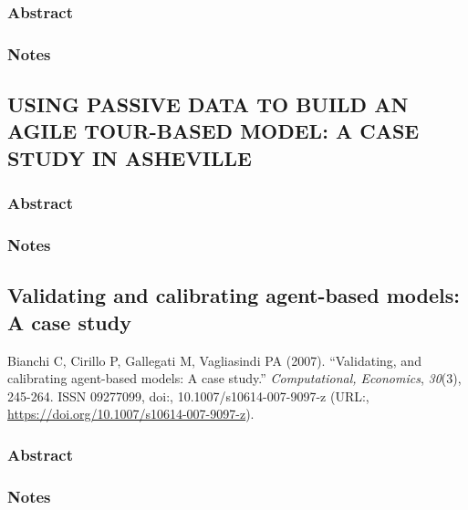 \documentclass[
]{article}
\begin{document}
\hypertarget{abstract-9}{%
\subsubsection{Abstract}\label{abstract-9}}

\hypertarget{notes-9}{%
\subsubsection{Notes}\label{notes-9}}

\hypertarget{using-passive-data-to-build-an-agile-tour-based-model-a-case-study-in-asheville}{%
\subsection{USING PASSIVE DATA TO BUILD AN AGILE TOUR-BASED MODEL: A
CASE STUDY IN
ASHEVILLE}\label{using-passive-data-to-build-an-agile-tour-based-model-a-case-study-in-asheville}}

\hypertarget{abstract-10}{%
\subsubsection{Abstract}\label{abstract-10}}

\hypertarget{notes-10}{%
\subsubsection{Notes}\label{notes-10}}

\hypertarget{validating-and-calibrating-agent-based-models-a-case-study}{%
\subsection{Validating and calibrating agent-based models: A case
study}\label{validating-and-calibrating-agent-based-models-a-case-study}}

Bianchi C, Cirillo P, Gallegati M, Vagliasindi PA (2007). ``Validating,
and calibrating agent-based models: A case study.'' \emph{Computational,
Economics}, \emph{30}(3), 245-264. ISSN 09277099, doi:,
10.1007/s10614-007-9097-z (URL:,
\url{https://doi.org/10.1007/s10614-007-9097-z}).

\hypertarget{abstract-11}{%
\subsubsection{Abstract}\label{abstract-11}}

\hypertarget{notes-11}{%
\subsubsection{Notes}\label{notes-11}}
\end{document}
